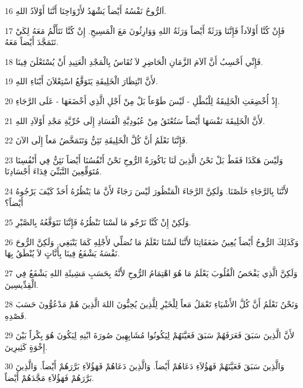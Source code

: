 \par 16 اَلرُّوحُ نَفْسُهُ أَيْضاً يَشْهَدُ لأَرْوَاحِنَا أَنَّنَا أَوْلاَدُ اللهِ.
\par 17 فَإِنْ كُنَّا أَوْلاَداً فَإِنَّنَا وَرَثَةٌ أَيْضاً وَرَثَةُ اللهِ وَوَارِثُونَ مَعَ الْمَسِيحِ. إِنْ كُنَّا نَتَأَلَّمُ مَعَهُ لِكَيْ نَتَمَجَّدَ أَيْضاً مَعَهُ.
\par 18 فَإِنِّي أَحْسِبُ أَنَّ آلاَمَ الزَّمَانِ الْحَاضِرِ لاَ تُقَاسُ بِالْمَجْدِ الْعَتِيدِ أَنْ يُسْتَعْلَنَ فِينَا.
\par 19 لأَنَّ انْتِظَارَ الْخَلِيقَةِ يَتَوَقَّعُ اسْتِعْلاَنَ أَبْنَاءِ اللهِ.
\par 20 إِذْ أُخْضِعَتِ الْخَلِيقَةُ لِلْبُطْلِ - لَيْسَ طَوْعاً بَلْ مِنْ أَجْلِ الَّذِي أَخْضَعَهَا - عَلَى الرَّجَاءِ.
\par 21 لأَنَّ الْخَلِيقَةَ نَفْسَهَا أَيْضاً سَتُعْتَقُ مِنْ عُبُودِيَّةِ الْفَسَادِ إِلَى حُرِّيَّةِ مَجْدِ أَوْلاَدِ اللهِ.
\par 22 فَإِنَّنَا نَعْلَمُ أَنَّ كُلَّ الْخَلِيقَةِ تَئِنُّ وَتَتَمَخَّضُ مَعاً إِلَى الآنَ.
\par 23 وَلَيْسَ هَكَذَا فَقَطْ بَلْ نَحْنُ الَّذِينَ لَنَا بَاكُورَةُ الرُّوحِ نَحْنُ أَنْفُسُنَا أَيْضاً نَئِنُّ فِي أَنْفُسِنَا مُتَوَقِّعِينَ التَّبَنِّيَ فِدَاءَ أَجْسَادِنَا.
\par 24 لأَنَّنَا بِالرَّجَاءِ خَلَصْنَا. وَلَكِنَّ الرَّجَاءَ الْمَنْظُورَ لَيْسَ رَجَاءً لأَنَّ مَا يَنْظُرُهُ أَحَدٌ كَيْفَ يَرْجُوهُ أَيْضاً؟
\par 25 وَلَكِنْ إِنْ كُنَّا نَرْجُو مَا لَسْنَا نَنْظُرُهُ فَإِنَّنَا نَتَوَقَّعُهُ بِالصَّبْرِ.
\par 26 وَكَذَلِكَ الرُّوحُ أَيْضاً يُعِينُ ضَعَفَاتِنَا لأَنَّنَا لَسْنَا نَعْلَمُ مَا نُصَلِّي لأَجْلِهِ كَمَا يَنْبَغِي. وَلَكِنَّ الرُّوحَ نَفْسَهُ يَشْفَعُ فِينَا بِأَنَّاتٍ لاَ يُنْطَقُ بِهَا.
\par 27 وَلَكِنَّ الَّذِي يَفْحَصُ الْقُلُوبَ يَعْلَمُ مَا هُوَ اهْتِمَامُ الرُّوحِ لأَنَّهُ بِحَسَبِ مَشِيئَةِ اللهِ يَشْفَعُ فِي الْقِدِّيسِينَ.
\par 28 وَنَحْنُ نَعْلَمُ أَنَّ كُلَّ الأَشْيَاءِ تَعْمَلُ مَعاً لِلْخَيْرِ لِلَّذِينَ يُحِبُّونَ اللهَ الَّذِينَ هُمْ مَدْعُوُّونَ حَسَبَ قَصْدِهِ.
\par 29 لأَنَّ الَّذِينَ سَبَقَ فَعَرَفَهُمْ سَبَقَ فَعَيَّنَهُمْ لِيَكُونُوا مُشَابِهِينَ صُورَةَ ابْنِهِ لِيَكُونَ هُوَ بِكْراً بَيْنَ إِخْوَةٍ كَثِيرِينَ.
\par 30 وَالَّذِينَ سَبَقَ فَعَيَّنَهُمْ فَهَؤُلاَءِ دَعَاهُمْ أَيْضاً. وَالَّذِينَ دَعَاهُمْ فَهَؤُلاَءِ بَرَّرَهُمْ أَيْضاً. وَالَّذِينَ بَرَّرَهُمْ فَهَؤُلاَءِ مَجَّدَهُمْ أَيْضاً.
